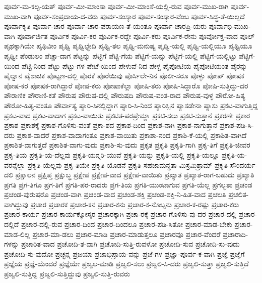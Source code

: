 {ಪೂರ್ವ-ಮ-ಕಲ್ಪ-ಯತ್
ಪೂರ್ವ-ಮೀ-ಮಾಂಸಾ
ಪೂರ್ವ-ಮೀ-ಮಾಂಸೆ-ಯಲ್ಲಿ-ರುವ
ಪೂರ್ವ-ಮುಖ-ರಾಗಿ
ಪೂರ್ವ-ಮುಖ-ವಾಗಿ
ಪೂರ್ವ-ಸಂಪ್ರದಾಯ-ದ-ವರು
ಪೂರ್ವ-ಸಂಸ್ಕಾರ
ಪೂರ್ವ-ಸಂಸ್ಕಾರ-ವೆಂಬ
ಪೂರ್ವ-ಸಿದ್ಧ-ತೆ-ಯಿಲ್ಲದೆ
ಪೂರ್ವಾಕೃತಿ
ಪೂರ್ವಾ-ಚಾರ
ಪೂರ್ವಾ-ಚಾರ-ಪರಾಯಣ-ತೆ-ಯಂತೂ
ಪೂರ್ವಾ-ಚಾರಪ್ರಿ-ಯರು
ಪೂರ್ವಾಭಿ-ಮುಖ-ವಾಗಿ
ಪೂರ್ವಾರ್ಜಿತ
ಪೂರ್ವಿಕ
ಪೂರ್ವಿ-ಕರ
ಪೂರ್ವಿಕ-ರದ್ದೇ
ಪೂರ್ವಿ-ಕರು
ಪೂರ್ವಿಕ-ರೇನು
ಪೂರ್ವೋಕ್ತ-ವಾದ
ಪೂಲ್
ಪೃಥಕ್ಕಾಗಿಯೇ
ಪೃಥಿವೀಂ
ಪೃಥ್ವಿ
ಪೃಥ್ವಿಛ್ಛೇದಿ
ಪೃಥ್ವಿ-ತಲ
ಪೃಥ್ವಿ-ಮನುಷ್ಯ
ಪೃಥ್ವಿ-ಯಲ್ಲಿ
ಪೃಥ್ವಿ-ಯಲ್ಲಿಯೂ
ಪೃಥ್ವಿಯೂ
ಪೃಥ್ವೀ
ಪೆಂಡುಲಂ
ಪೆಚ್ಚಾ-ದಾಗ
ಪೆಟ್ಟನ್ನು
ಪೆಟ್ಟಿಗೆ
ಪೆಟ್ಟಿ-ಗೆಯ
ಪೆಟ್ಟಿಗೆ-ಯನ್ನು
ಪೆಟ್ಟಿಗೆ-ಯಲ್ಲಿ
ಪೆಟ್ಟಿಗೆ-ಯಲ್ಲಿಟ್ಟು
ಪೆಟ್ಟಿಗೆ-ಯಿಂದ
ಪೆಟ್ಟಿ-ನಿಂದ
ಪೆಟ್ಟು
ಪೆಟ್ಟು-ಗಳ
ಪೇಟೆ-ಯಿಂದ
ಪೇಳುವೆ-ನಿದ
ಪೇಳ್ದ
ಪೈಪೋಟಿಯ
ಪೈಪೋಟಿಯಂತ
ಪೈರನ್ನು
ಪೈಲ್ವಾನ
ಪೈಶಾಚಿಕ
ಪೊಟ್ಟಣ-ದಲ್ಲಿ
ಪೊರಕೆ
ಪೊರೆಯಿವು
ಪೊರ್ಸಿಲೇ-ನಿನ
ಪೊಲೀ-ಸರೂ
ಪೊಳ್ಳು
ಪೋಪ್
ಪೋಷಕ
ಪೋಷ-ಕರ
ಪೋಷಕ-ರಾಗಿದ್ದಾರೆ
ಪೋಷ-ಕರು
ಪೋಷಾಕೆಲ್ಲಾ
ಪೋಷಿ-ತರು
ಪೋಷಿ-ಸಿದ್ದಾರೊ
ಪೋಷಿ-ಸುತ್ತಿದ್ದು-ದರ
ಪೌರಾಣಿಕ
ಪೌರಾಣಿ-ಕತೆ
ಪೌರುಷ
ಪೌರುಷ-ದಲ್ಲಿ
ಪೌರುಷದಿ
ಪೌರುಷ-ವಂತ-ರಾದ
ಪೌರುಷ-ವುಳ್ಳ
ಪೌರೋ-ಹಿತ್ಯ
ಪೌರೋ-ಹಿತ್ಯ-ವಂತೂ
ಪೌರ್ವಾತ್ಯ
ಪ್ಯಾರಿ-ಸಿನಲ್ಲಿದ್ದಾಗ
ಪ್ಯಾರಿ-ಸಿ-ನಿಂದ
ಪ್ಯಾರಿಸ್ಸಿನ
ಪ್ಯಾಸಡೇನಾ
ಪ್ಯಾಸು
ಪ್ರಕಟ-ವಾಗುತ್ತಿದ್ದ
ಪ್ರಕಟ-ವಾದ
ಪ್ರಕಟ-ವಾದಾಗ
ಪ್ರಕಟ-ವಾಯಿತು
ಪ್ರಕಟಿತ-ಪರಪ್ರೇಮ್ಣಾ
ಪ್ರಕಟಿ-ಸಲು
ಪ್ರಕಟಿ-ಸುತ್ತಾನೆ
ಪ್ರಕರಣೇ
ಪ್ರಕಾರ
ಪ್ರಕಾಶ
ಪ್ರಕಾಶಕ್ಕೆ
ಪ್ರಕಾಶ-ಗೊಳಿಸು-ವಂತೆ
ಪ್ರಕಾ-ಶದ
ಪ್ರಕಾಶ-ದಿಂದ
ಪ್ರಕಾಶ-ನಾಗಿ
ಪ್ರಕಾಶ-ನಾಗುತ್ತಾನೆ
ಪ್ರಕಾಶ-ಪಡಿ-ಸಿ-ದರು
ಪ್ರಕಾಶ-ವಾದರೆ
ಪ್ರಕಾಶ-ವಾದಾಗಂತೂ
ಪ್ರಕಾಶ-ವಾಯಿತು
ಪ್ರಕಾಶಾ-ನಂದ
ಪ್ರಕಾಶಿ-ಕೆ-ಯಲ್ಲಿ
ಪ್ರಕಾಶಿತ-ವಾಗಿದೆ
ಪ್ರಕಾಶಿತ-ವಾಗುತ್ತದೆ
ಪ್ರಕಾಶಿತ-ವಾಗು-ವುದು
ಪ್ರಕಾಶಿ-ಸು-ವುದು
ಪ್ರಕೃತ
ಪ್ರಕೃತಿ
ಪ್ರಕೃತಿ-ಗಾಗಿ
ಪ್ರಕೃ-ತಿಗೆ
ಪ್ರಕೃತಿ-ಜೀವರ
ಪ್ರಕೃ-ತಿಯ
ಪ್ರಕೃತಿ-ಯ-ದೆಲ್ಲವು
ಪ್ರಕೃತಿ-ಯನ್ನರಿ-ಯುವೆ
ಪ್ರಕೃತಿ-ಯನ್ನು
ಪ್ರಕೃತಿ-ಯಲ್ಲಿ
ಪ್ರಕೃತಿ-ಯಲ್ಲೂ
ಪ್ರಕೃತಿ-ಯ-ವರನ್ನೆಲ್ಲಾ
ಪ್ರಕೃತಿ-ಯೆಲ್ಲವು
ಪ್ರಕೃ-ತಿಯೇ
ಪ್ರಕೃತಿ-ಯೊಡನೆ
ಪ್ರಕೃತಿ-ಸಹಜಾಮನ್ಧತಾ-ಮಿಸ್ರಮಿಶ್ರಾಮ್
ಪ್ರಕೃತಿ-ಸೌಂದರ್ಯ-ದಲಿ
ಪ್ರಕ್ಷಾಲನ
ಪ್ರಕ್ಷಿಪ್ತ
ಪ್ರಕ್ಷುಬ್ಧ
ಪ್ರಕ್ಷೇಪ
ಪ್ರಕ್ಷೇಪ-ವಾದ
ಪ್ರಕ್ಷೇಪ-ವಾಯಿತು
ಪ್ರಖ್ಯಾತ
ಪ್ರಖ್ಯಾತ-ರಾಗ-ಬಹುದು
ಪ್ರಖ್ಯಾತಿ
ಪ್ರಗತಿ
ಪ್ರಗ-ತಿಗೂ
ಪ್ರಗ-ತಿಗೆ
ಪ್ರಗತಿ-ಪರ-ರಾದರು
ಪ್ರಗ-ತಿಯ
ಪ್ರಗತಿ-ಯುಂಟಾಗುವ
ಪ್ರಗತಿ-ಯೆಲ್ಲ
ಪ್ರಗಲ್ಭತಾ
ಪ್ರಚಂಡ
ಪ್ರಚಂಡ-ಪುರುಷರೊ
ಪ್ರಚಂಡ-ವಾಗಿ
ಪ್ರಚಂಡ-ವಾದ
ಪ್ರಚಂಡ-ಶಕ್ತಿ
ಪ್ರಚಂಡ-ಶಕ್ತಿ-ನಿ-ಹಿತ-ವಾದ
ಪ್ರಚಲತಿ
ಪ್ರಚಲಿತ-ವಾಗಿದ್ದುವು
ಪ್ರಚಾರ
ಪ್ರಚಾರಕ
ಪ್ರಚಾರ-ಕನ
ಪ್ರಚಾರ-ಕನು
ಪ್ರಚಾರ-ಕ-ನೊಬ್ಬನು
ಪ್ರಚಾರ-ಕ-ರಷ್ಟು
ಪ್ರಚಾರ-ಕರು
ಪ್ರಚಾರ-ಕಾರ್ಯ
ಪ್ರಚಾರ-ಕಾರ್ಯಕ್ಕೋಸ್ಕರ
ಪ್ರಚಾರಕ್ಕಾಗಿ
ಪ್ರಚಾ-ರಕ್ಕೆ
ಪ್ರಚಾರ-ಗೊಳಿಸು-ವು-ದರ
ಪ್ರಚಾರ-ದಲ್ಲಿ
ಪ್ರಚಾರ-ದಲ್ಲಿದೆ
ಪ್ರಚಾರ-ದಲ್ಲಿ-ರುವ
ಪ್ರಚಾರ-ದಿಂದ
ಪ್ರಚಾರ-ದಿಂದಲೂ
ಪ್ರಚಾರ-ಪಡಿ-ಸಿತೋ
ಪ್ರಚಾರ-ಮಾಡ-ಬೇಕು
ಪ್ರಚಾರ-ಮಾಡ-ಲಿಲ್ಲ
ಪ್ರಚಾರ-ಮಾ-ಡಲು
ಪ್ರಚಾರ-ಮಾಡಿ
ಪ್ರಚಾರ-ಮಾಡುತ್ತಲೂ
ಪ್ರಚಾರವೂ
ಪ್ರಚಾರ-ವೆಂದರೆ
ಪ್ರಚಾರಾದಿ-ಗಳನ್ನು
ಪ್ರಚಾರಿತ-ವಾದ
ಪ್ರಚೋದಿ-ತ-ವಾಗಿ
ಪ್ರಚೋದಿ-ಸುತ್ತಿ-ರುವಳೋ
ಪ್ರಚೋದಿ-ಸುವ
ಪ್ರಚೋದಿ-ಸು-ವುದು
ಪ್ರಚೋದಿ-ಸು-ವುದೋ
ಪ್ರಚ್ಛನ್ನ
ಪ್ರಜಯಾ
ಪ್ರಜಾಭಿಪ್ರಾಯ-ವನ್ನು
ಪ್ರಜೆ-ಗಳ
ಪ್ರಜ್ಞಾ-ಪೂರ್ವ-ಕ-ವಾಗಿ
ಪ್ರಜ್ಞೆ
ಪ್ರಜ್ಞೆಗೆ
ಪ್ರಜ್ಞೆಯ
ಪ್ರಜ್ಞೆ-ಯೆಂದರೆ
ಪ್ರಜ್ಞೆಯೇ
ಪ್ರಜ್ವಲ-ಮಾಡಿ
ಪ್ರಜ್ವಲಿ-ಸಲು
ಪ್ರಜ್ವಲಿ-ಸಿ-ದರು
ಪ್ರಜ್ವಲಿ-ಸುತ್ತಾ
ಪ್ರಜ್ವಲಿ-ಸುತ್ತಿದೆ
ಪ್ರಜ್ವಲಿ-ಸುತ್ತಿದ್ದ
ಪ್ರಜ್ವಲಿ-ಸುತ್ತಿದ್ದುವು
ಪ್ರಜ್ವಲಿ-ಸುತ್ತಿ-ರುವರು
}
